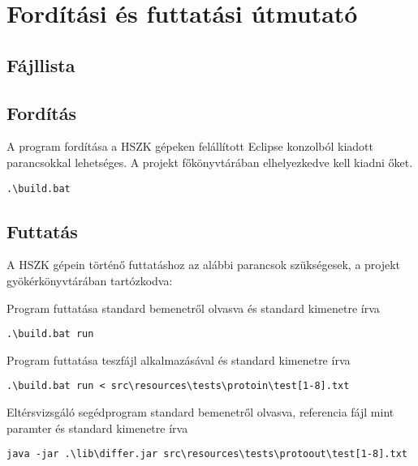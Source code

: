 \section{Fordítási és futtatási útmutató}

\subsection{Fájllista}


\subsection{Fordítás}
A program fordítása a HSZK gépeken felállított Eclipse konzolból kiadott parancsokkal lehetséges.
A projekt főkönyvtárában elhelyezkedve kell kiadni őket.

\lstset{escapeinside=`', xleftmargin=10pt, frame=single, basicstyle=\ttfamily\footnotesize, language=sh}
\begin{lstlisting}
.\build.bat
\end{lstlisting}

\subsection{Futtatás}
A HSZK gépein történő futtatáshoz az alábbi parancsok szükségesek, a projekt gyökérkönyvtárában tartózkodva:

Program futtatása standard bemenetről olvasva és standard kimenetre írva
\lstset{escapeinside=`', xleftmargin=10pt, frame=single, basicstyle=\ttfamily\footnotesize, language=sh}
\begin{lstlisting}
.\build.bat run
\end{lstlisting}

Program futtatása teszfájl alkalmazásával és standard kimenetre írva
\lstset{escapeinside=`', xleftmargin=10pt, frame=single, basicstyle=\ttfamily\footnotesize, language=sh}
\begin{lstlisting}
.\build.bat run < src\resources\tests\protoin\test[1-8].txt
\end{lstlisting}

Eltérsvizsgáló segédprogram standard bemenetről olvasva, referencia fájl mint paramter és standard kimenetre írva
\lstset{escapeinside=`', xleftmargin=10pt, frame=single, basicstyle=\ttfamily\footnotesize, language=sh}
\begin{lstlisting}
java -jar .\lib\differ.jar src\resources\tests\protoout\test[1-8].txt
\end{lstlisting}


